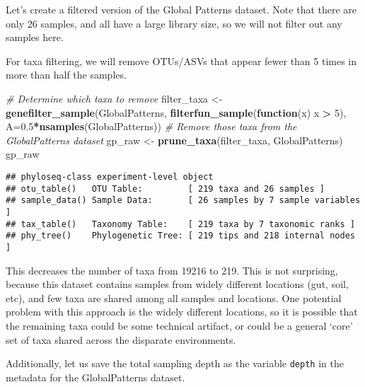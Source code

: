\documentclass[
]{book}
\newenvironment{Shaded}{\begin{snugshade}}{\end{snugshade}}
\newcommand{\CommentTok}[1]{\textcolor[rgb]{0.56,0.35,0.01}{\textit{#1}}}
\newcommand{\ControlFlowTok}[1]{\textcolor[rgb]{0.13,0.29,0.53}{\textbf{#1}}}
\newcommand{\DataTypeTok}[1]{\textcolor[rgb]{0.13,0.29,0.53}{#1}}
\newcommand{\DecValTok}[1]{\textcolor[rgb]{0.00,0.00,0.81}{#1}}
\newcommand{\FloatTok}[1]{\textcolor[rgb]{0.00,0.00,0.81}{#1}}
\newcommand{\KeywordTok}[1]{\textcolor[rgb]{0.13,0.29,0.53}{\textbf{#1}}}
\newcommand{\NormalTok}[1]{#1}
\newcommand{\OperatorTok}[1]{\textcolor[rgb]{0.81,0.36,0.00}{\textbf{#1}}}
\newcommand{\StringTok}[1]{\textcolor[rgb]{0.31,0.60,0.02}{#1}}
\begin{document}
Let's create a filtered version of the Global Patterns dataset. Note that there are only 26 samples, and all have a large library size, so we will not filter out any samples here.

For taxa filtering, we will remove OTUs/ASVs that appear fewer than 5 times in more than half the samples.

\begin{Shaded}
\begin{Highlighting}[]
\CommentTok{\# Determine which taxa to remove}
\NormalTok{filter\_taxa \textless{}{-}}\StringTok{ }\KeywordTok{genefilter\_sample}\NormalTok{(GlobalPatterns,}
                                 \KeywordTok{filterfun\_sample}\NormalTok{(}\ControlFlowTok{function}\NormalTok{(x) x }\OperatorTok{\textgreater{}}\StringTok{ }\DecValTok{5}\NormalTok{),}
                                 \DataTypeTok{A=}\FloatTok{0.5}\OperatorTok{*}\KeywordTok{nsamples}\NormalTok{(GlobalPatterns))}
\CommentTok{\# Remove those taxa from the GlobalPatterns dataset}
\NormalTok{gp\_raw \textless{}{-}}\StringTok{ }\KeywordTok{prune\_taxa}\NormalTok{(filter\_taxa, GlobalPatterns)}
\NormalTok{gp\_raw}
\end{Highlighting}
\end{Shaded}

\begin{verbatim}
## phyloseq-class experiment-level object
## otu_table()   OTU Table:         [ 219 taxa and 26 samples ]
## sample_data() Sample Data:       [ 26 samples by 7 sample variables ]
## tax_table()   Taxonomy Table:    [ 219 taxa by 7 taxonomic ranks ]
## phy_tree()    Phylogenetic Tree: [ 219 tips and 218 internal nodes ]
\end{verbatim}

This decreases the number of taxa from 19216 to 219. This is not surprising, because this dataset contains samples from widely different locations (gut, soil, etc), and few taxa are shared among all samples and locations. One potential problem with this approach is the widely different locations, so it is possible that the remaining taxa could be some technical artifact, or could be a general `core' set of taxa shared across the disparate environments.

Additionally, let us save the total sampling depth as the variable \texttt{depth} in the metadata for the GlobalPatterns dataset.

\begin{Shaded}
\end{Shaded}
\end{document}
